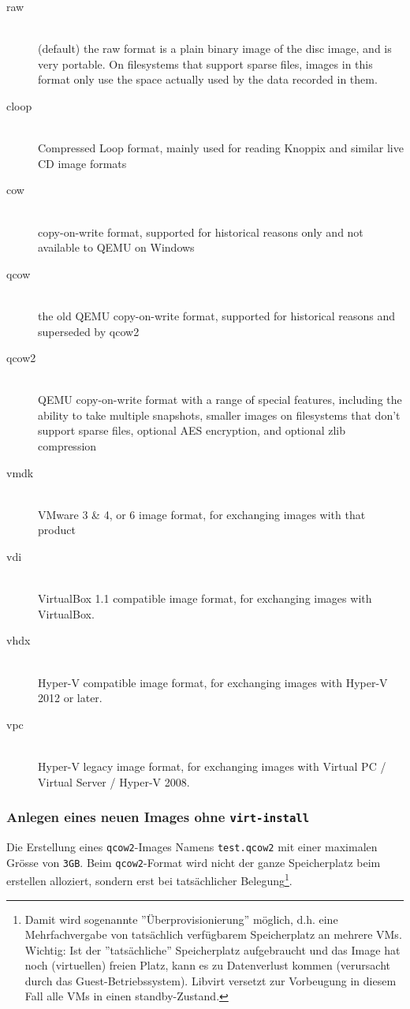 \begin{description}
	\item[raw] \hfill \\
	(default) the raw format is a plain binary image of the disc image, and is very portable. On filesystems that support sparse files, images in this format only use the space actually used by the data recorded in them.
	\item[cloop] \hfill \\
	Compressed Loop format, mainly used for reading Knoppix and similar live CD image formats
	\item[cow] \hfill \\
	copy-on-write format, supported for historical reasons only and not available to QEMU on Windows
	\item[qcow] \hfill \\
	the old QEMU copy-on-write format, supported for historical reasons and superseded by qcow2
	\item[qcow2] \hfill \\
	QEMU copy-on-write format with a range of special features, including the ability to take multiple snapshots, smaller images on filesystems that don't support sparse files, optional AES encryption, and optional zlib compression
	\item[vmdk] \hfill \\
	VMware 3 \& 4, or 6 image format, for exchanging images with that product
	\item[vdi] \hfill \\
	VirtualBox 1.1 compatible image format, for exchanging images with VirtualBox.
	\item[vhdx] \hfill \\
	Hyper-V compatible image format, for exchanging images with Hyper-V 2012 or later.
	\item[vpc] \hfill \\
	Hyper-V legacy image format, for exchanging images with Virtual PC / Virtual Server / Hyper-V 2008. 
\end{description}

\subsubsection{Anlegen eines neuen Images ohne \lstinline|virt-install|}
Die Erstellung eines \lstinline|qcow2|-Images Namens \lstinline|test.qcow2| mit einer maximalen Grösse von \lstinline|3GB|. Beim \lstinline|qcow2|-Format wird nicht der ganze Speicherplatz beim erstellen alloziert, sondern erst bei tatsächlicher Belegung\footnote{Damit wird sogenannte ''Überprovisionierung'' möglich, d.h. eine Mehrfachvergabe von tatsächlich verfügbarem Speicherplatz an mehrere VMs. Wichtig: Ist der ''tatsächliche'' Speicherplatz aufgebraucht und das Image hat noch (virtuellen) freien Platz, kann es zu Datenverlust kommen (verursacht durch das Guest-Betriebssystem). Libvirt versetzt zur Vorbeugung in diesem Fall alle VMs in einen standby-Zustand.}.


